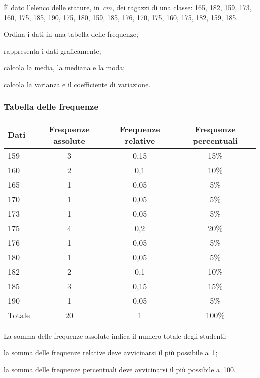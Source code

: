 \begin{esempio}

È dato l'elenco delle stature, in~\(\unit{cm}\), dei ragazzi di
una classe: 165, 182, 159, 173, 160, 175, 185, 190, 175, 180, 159, 185, 
176, 170, 175, 160, 175, 182, 159, 185.

\begin{enumeratea}
\item Ordina i dati in una tabella delle frequenze;
\item rappresenta i dati graficamente;
\item calcola la media, la mediana e la moda;
\item calcola la varianza e il coefficiente di variazione.
\end{enumeratea}

\subsubsection{Tabella delle frequenze}

\begin{center}
\begin{tabular}{lccc}
\toprule
Dati & Frequenze assolute & Frequenze relative & Frequenze percentuali\\
\midrule
159 & 3 & 0,15 & 15\% \\
160 & 2 & 0,1 & 10\% \\
165 & 1 & 0,05 & 5\% \\
170 & 1 & 0,05 & 5\% \\
173 & 1 & 0,05 & 5\% \\
175 & 4 & 0,2 & 20\% \\
176 & 1 & 0,05 & 5\% \\
180 & 1 & 0,05 & 5\% \\
182 & 2 & 0,1 & 10\% \\
185 & 3 & 0,15 & 15\% \\
190 & 1 & 0,05 & 5\% \\
\midrule
Totale & 20 & 1 & 100\% \\
\bottomrule
\end{tabular}
\end{center}
\begin{itemize*}
\item La somma delle frequenze assolute indica il numero totale degli 
studenti;
\item la somma delle frequenze relative deve avvicinarsi il più possibile 
a~1;
\item la somma delle frequenze percentuali deve avvicinarsi il più 
possibile a~100.
\end{itemize*}
\vspace{-24pt}

\end{esempio}

